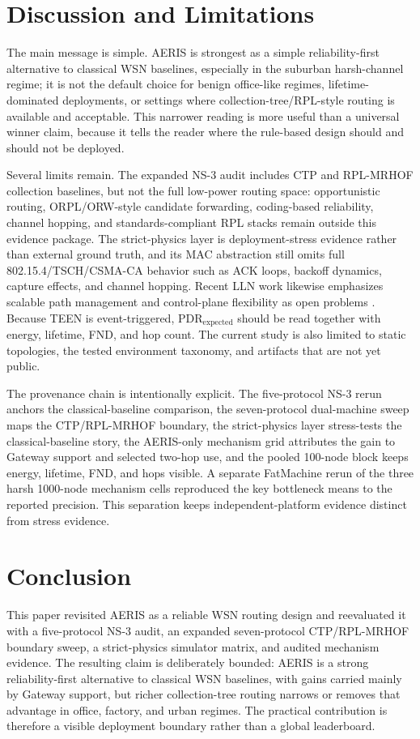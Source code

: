 \documentclass[conference]{IEEEtran}
\begin{document}
\section{Discussion and Limitations}
The main message is simple. AERIS is strongest as a simple reliability-first alternative to classical WSN baselines, especially in the suburban harsh-channel regime; it is not the default choice for benign office-like regimes, lifetime-dominated deployments, or settings where collection-tree/RPL-style routing is available and acceptable. This narrower reading is more useful than a universal winner claim, because it tells the reader where the rule-based design should and should not be deployed.

Several limits remain. The expanded NS-3 audit includes CTP and RPL-MRHOF collection baselines, but not the full low-power routing space: opportunistic routing, ORPL/ORW-style candidate forwarding, coding-based reliability, channel hopping, and standards-compliant RPL stacks remain outside this evidence package. The strict-physics layer is deployment-stress evidence rather than external ground truth, and its MAC abstraction still omits full 802.15.4/TSCH/CSMA-CA behavior such as ACK loops, backoff dynamics, capture effects, and channel hopping. Recent LLN work likewise emphasizes scalable path management and control-plane flexibility as open problems \cite{Almutairi2024LLNSurvey,Djennadi2025SDNLLN}. Because TEEN is event-triggered, $\mathrm{PDR}_{\mathrm{expected}}$ should be read together with energy, lifetime, FND, and hop count. The current study is also limited to static topologies, the tested environment taxonomy, and artifacts that are not yet public.

The provenance chain is intentionally explicit. The five-protocol NS-3 rerun anchors the classical-baseline comparison, the seven-protocol dual-machine sweep maps the CTP/RPL-MRHOF boundary, the strict-physics layer stress-tests the classical-baseline story, the AERIS-only mechanism grid attributes the gain to Gateway support and selected two-hop use, and the pooled 100-node block keeps energy, lifetime, FND, and hops visible. A separate FatMachine rerun of the three harsh 1000-node mechanism cells reproduced the key bottleneck means to the reported precision. This separation keeps independent-platform evidence distinct from stress evidence.

\section{Conclusion}
This paper revisited AERIS as a reliable WSN routing design and reevaluated it with a five-protocol NS-3 audit, an expanded seven-protocol CTP/RPL-MRHOF boundary sweep, a strict-physics simulator matrix, and audited mechanism evidence. The resulting claim is deliberately bounded: AERIS is a strong reliability-first alternative to classical WSN baselines, with gains carried mainly by Gateway support, but richer collection-tree routing narrows or removes that advantage in office, factory, and urban regimes. The practical contribution is therefore a visible deployment boundary rather than a global leaderboard.
\end{document}
